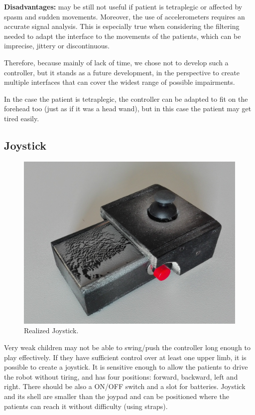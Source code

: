 \documentclass[a4paper,twoside]{book}
\begin{document}
\textbf{Disadvantages:} may be still not useful if patient is tetraplegic or affected by spasm and sudden movements. Moreover, the use of accelerometers requires an accurate signal analysis. This is especially true when considering the filtering needed to adapt the interface to the movements of the patients, which can be imprecise, jittery or discontinuous. 

Therefore, because mainly of lack of time, we chose not to develop such a controller, but it stands as a future development, in the perspective to create multiple interfaces that can cover the widest range of possible impairments.

In the case the patient is tetraplegic, the controller can be adapted to fit on the forehead too (just as if it was a head wand), but in this case the patient may get tired easily.

\subsection{Joystick}

\begin{figure}[h]
\centering
\includegraphics[width=0.8\linewidth]{img/IMG_20160613_153916_1} 
\caption{Realized Joystick.}
\end{figure}

Very weak children may not be able to swing/push the controller long enough to play effectively. If they have sufficient control over at least one upper limb, it is possible to create a joystick. It is sensitive enough to allow the patients to drive the robot without tiring, and has four positions: forward, backward, left and right. There should be also a ON/OFF switch and a slot for batteries. Joystick and its shell are smaller than the joypad and can be positioned where the patients can reach it without difficulty (using straps).
\\
\end{document}
